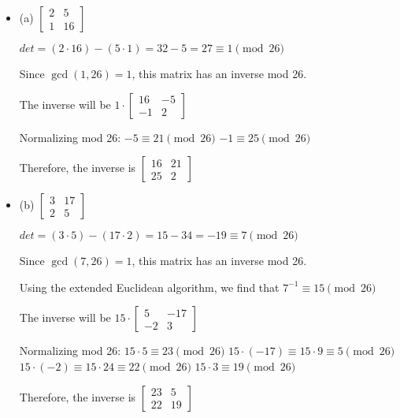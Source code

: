 \documentclass[12pt]{article}
\begin{document}
\begin{itemize}
    \item (a) $\begin{bmatrix} 2 & 5 \\ 1 & 16 \end{bmatrix}$
    
    $det = (2 \cdot 16) - (5 \cdot 1) = 32 - 5 = 27 \equiv 1 \pmod{26}$
    
    Since $\gcd(1,26) = 1$, this matrix has an inverse mod 26.
    
    The inverse will be $1 \cdot \begin{bmatrix} 16 & -5 \\ -1 & 2 \end{bmatrix}$
    
    Normalizing mod 26:
    $-5 \equiv 21 \pmod{26}$
    $-1 \equiv 25 \pmod{26}$
    
    Therefore, the inverse is $\begin{bmatrix} 16 & 21 \\ 25 & 2 \end{bmatrix}$
    
    \item (b) $\begin{bmatrix} 3 & 17 \\ 2 & 5 \end{bmatrix}$
    
    $det = (3 \cdot 5) - (17 \cdot 2) = 15 - 34 = -19 \equiv 7 \pmod{26}$
    
    Since $\gcd(7,26) = 1$, this matrix has an inverse mod 26.
    
    Using the extended Euclidean algorithm, we find that $7^{-1} \equiv 15 \pmod{26}$
    
    The inverse will be $15 \cdot \begin{bmatrix} 5 & -17 \\ -2 & 3 \end{bmatrix}$
    
    Normalizing mod 26:
    $15 \cdot 5 \equiv 23 \pmod{26}$
    $15 \cdot (-17) \equiv 15 \cdot 9 \equiv 5 \pmod{26}$
    $15 \cdot (-2) \equiv 15 \cdot 24 \equiv 22 \pmod{26}$
    $15 \cdot 3 \equiv 19 \pmod{26}$
    
    Therefore, the inverse is $\begin{bmatrix} 23 & 5 \\ 22 & 19 \end{bmatrix}$
\end{itemize}
\end{document}
